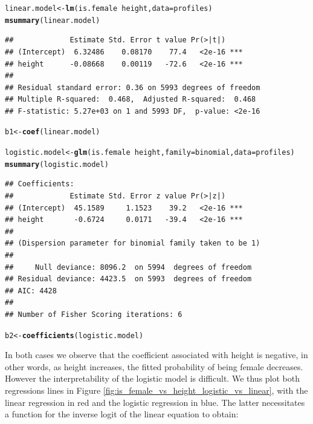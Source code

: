 \documentclass{article}\usepackage[]{graphicx}\usepackage[]{color}
\makeatletter
\newcommand{\hlopt}[1]{\textcolor[rgb]{0,0,0}{#1}}%
\newcommand{\hlstd}[1]{\textcolor[rgb]{0.345,0.345,0.345}{#1}}%
\newcommand{\hlkwb}[1]{\textcolor[rgb]{0.69,0.353,0.396}{#1}}%
\newcommand{\hlkwc}[1]{\textcolor[rgb]{0.333,0.667,0.333}{#1}}%
\newcommand{\hlkwd}[1]{\textcolor[rgb]{0.737,0.353,0.396}{\textbf{#1}}}%
\newenvironment{kframe}{%
 \def\at@end@of@kframe{}%
 \ifinner\ifhmode%
  \def\at@end@of@kframe{\end{minipage}}%
  \begin{minipage}{\columnwidth}%
 \fi\fi%
 \def\FrameCommand##1{\hskip\@totalleftmargin \hskip-\fboxsep
 \colorbox{shadecolor}{##1}\hskip-\fboxsep
     \hskip-\linewidth \hskip-\@totalleftmargin \hskip\columnwidth}%
 \MakeFramed {\advance\hsize-\width
   \@totalleftmargin\z@ \linewidth\hsize
   \@setminipage}}%
 {\par\unskip\endMakeFramed%
 \at@end@of@kframe}
\newenvironment{knitrout}{}{} %
\makeatother
\begin{document}
\begin{knitrout}
\color{fgcolor}\begin{kframe}
\begin{alltt}
\hlstd{linear.model} \hlkwb{<-} \hlkwd{lm}\hlstd{(is.female} \hlopt{~} \hlstd{height,} \hlkwc{data}\hlstd{=profiles)}
\hlkwd{msummary}\hlstd{(linear.model)}
\end{alltt}
\begin{verbatim}
##             Estimate Std. Error t value Pr(>|t|)    
## (Intercept)  6.32486    0.08170    77.4   <2e-16 ***
## height      -0.08668    0.00119   -72.6   <2e-16 ***
## 
## Residual standard error: 0.36 on 5993 degrees of freedom
## Multiple R-squared:  0.468,	Adjusted R-squared:  0.468 
## F-statistic: 5.27e+03 on 1 and 5993 DF,  p-value: <2e-16
\end{verbatim}
\begin{alltt}
\hlstd{b1} \hlkwb{<-} \hlkwd{coef}\hlstd{(linear.model)}
\end{alltt}
\end{kframe}
\end{knitrout}

\begin{knitrout}
\color{fgcolor}\begin{kframe}
\begin{alltt}
\hlstd{logistic.model} \hlkwb{<-} \hlkwd{glm}\hlstd{(is.female} \hlopt{~} \hlstd{height,} \hlkwc{family}\hlstd{=binomial,} \hlkwc{data}\hlstd{=profiles)}
\hlkwd{msummary}\hlstd{(logistic.model)}
\end{alltt}
\begin{verbatim}
## Coefficients:
##             Estimate Std. Error z value Pr(>|z|)    
## (Intercept)  45.1589     1.1523    39.2   <2e-16 ***
## height       -0.6724     0.0171   -39.4   <2e-16 ***
## 
## (Dispersion parameter for binomial family taken to be 1)
## 
##     Null deviance: 8096.2  on 5994  degrees of freedom
## Residual deviance: 4423.5  on 5993  degrees of freedom
## AIC: 4428
## 
## Number of Fisher Scoring iterations: 6
\end{verbatim}
\begin{alltt}
\hlstd{b2} \hlkwb{<-} \hlkwd{coefficients}\hlstd{(logistic.model)}
\end{alltt}
\end{kframe}
\end{knitrout}

In both cases we observe that the coefficient associated with height is negative, in other words, as height increases, the fitted probability of being female decreases.  However the interpretability of the logistic model is difficult.  We thus plot both regressions lines in Figure \ref{fig:is_female_vs_height_logistic_vs_linear}, with the linear regression in red and the logistic regression in blue.  The latter necessitates a function for the inverse logit of the linear equation to obtain:
\end{document}
